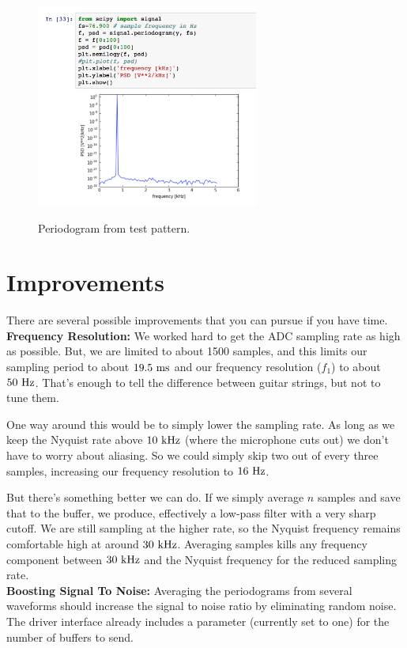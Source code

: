 \documentclass[12pt]{article}
\begin{document}
\begin{figure}[htbp]
\begin{center}
{\includegraphics[width=0.65\textwidth]{figs/periodogram.png}}
\end{center}
\caption{\label{fig:periodogram} Periodogram from test pattern.}
\end{figure}




\section{Improvements}

There are several possible improvements that you can pursue if you have time.\\

\noindent
{\bf Frequency Resolution:}  We worked hard to get the ADC sampling rate as high as possible.  But, we are limited to about 1500 samples, and this limits our sampling period to about $19.5~\rm ms$ and our frequency resolution ($f_1$) to about $50~\rm Hz$.  That's enough to tell the difference between guitar strings, but not to tune them.

One way around this would be to simply lower the sampling rate.  As long as we keep the Nyquist rate above $10~\rm kHz$ (where the microphone cuts out) we don't have to worry about aliasing.  So we could simply skip two out of every three samples, increasing our frequency resolution to $16~\rm Hz$.

But there's something better we can do.  If we simply average $n$ samples and save that to the buffer, we produce, effectively a low-pass filter with a very sharp cutoff.  We are still sampling at the higher rate, so the Nyquist frequency remains comfortable high at around $30~\rm kHz$.  Averaging samples kills any frequency component between $30~\rm kHz$ and the Nyquist frequency for the reduced sampling rate.\\

\noindent
{\bf Boosting Signal To Noise:}  Averaging the periodograms from several waveforms should increase the signal to noise ratio by eliminating random noise.  The driver interface already includes a parameter (currently set to one) for the number of buffers to send.
\end{document}
